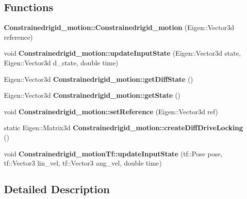\subsection*{Functions}
\begin{DoxyCompactItemize}
\item 
\mbox{\label{group__RigidMotion_ga1db11e0353c9a9f08e78fb935b0cee96}} 
{\bfseries Constrainedrigid\+\_\+motion\+::\+Constrainedrigid\+\_\+motion} (Eigen\+::\+Vector3d reference)
\item 
\mbox{\label{group__RigidMotion_ga67803463eb8fcb37eec415292fa6a13f}} 
void {\bfseries Constrainedrigid\+\_\+motion\+::update\+Input\+State} (Eigen\+::\+Vector3d state, Eigen\+::\+Vector3d d\+\_\+state, double time)
\item 
\mbox{\label{group__RigidMotion_ga8540758697945dc27502fcb557bb4871}} 
Eigen\+::\+Vector3d {\bfseries Constrainedrigid\+\_\+motion\+::get\+Diff\+State} ()
\item 
\mbox{\label{group__RigidMotion_ga1a34b67dd58d3137628811dfab7f54a1}} 
Eigen\+::\+Vector3d {\bfseries Constrainedrigid\+\_\+motion\+::get\+State} ()
\item 
\mbox{\label{group__RigidMotion_ga2cc2728f1d7865deea62a7fe540eee1a}} 
void {\bfseries Constrainedrigid\+\_\+motion\+::set\+Reference} (Eigen\+::\+Vector3d ref)
\item 
\mbox{\label{group__RigidMotion_ga8f1f65bf1494ab1ddc8fe3d2af5353a4}} 
static Eigen\+::\+Matrix3d {\bfseries Constrainedrigid\+\_\+motion\+::create\+Diff\+Drive\+Locking} ()
\item 
\mbox{\label{group__RigidMotion_ga5af2a56bafb5ce299234c63ac25257a0}} 
void {\bfseries Constrainedrigid\+\_\+motion\+Tf\+::update\+Input\+State} (tf\+::\+Pose pose, tf\+::\+Vector3 lin\+\_\+vel, tf\+::\+Vector3 ang\+\_\+vel, double time)
\end{DoxyCompactItemize}


\subsection{Detailed Description}
